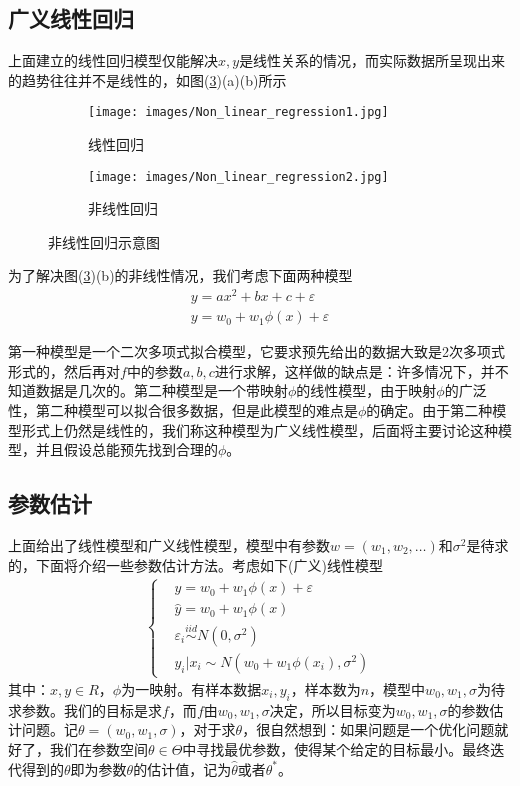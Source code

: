     \subsection{广义线性回归}
        \par
        上面建立的线性回归模型仅能解决$x,y$是线性关系的情况，而实际数据所呈现出来的趋势往往并不是线性的，如图(\ref{fig:非线性回归示意图})(a)(b)所示
\begin{figure}[H]
    \centering
    \begin{subfigure}[b]{0.35\textwidth}
        \texttt{[image: images/Non\_linear\_regression1.jpg]}
        \caption{线性回归}
        \label{fig:线性回归}
    \end{subfigure}
    \begin{subfigure}[b]{0.35\textwidth}
        \texttt{[image: images/Non\_linear\_regression2.jpg]}
        \caption{非线性回归}
        \label{fig:非线性回归}
    \end{subfigure}
    \caption{非线性回归示意图}\label{fig:非线性回归示意图}
\end{figure}
        为了解决图(\ref{fig:非线性回归示意图})(b)的非线性情况，我们考虑下面两种模型
        \begin{align*}
        y = ax^2+bx+c + \varepsilon\\
        y = w_0+w_1\phi(x) +\varepsilon
        \end{align*}
        \par
        第一种模型是一个二次多项式拟合模型，它要求预先给出的数据大致是2次多项式形式的，然后再对$f$中的参数$a,b,c$进行求解，这样做的缺点是：许多情况下，并不知道数据是几次的。第二种模型是一个带映射$\phi$的线性模型，由于映射$\phi$的广泛性，第二种模型可以拟合很多数据，但是此模型的难点是$\phi$的确定。由于第二种模型形式上仍然是线性的，我们称这种模型为广义线性模型，后面将主要讨论这种模型，并且假设总能预先找到合理的$\phi$。
    \subsection{参数估计}
        \par
        上面给出了线性模型和广义线性模型，模型中有参数$w = (w_1,w_2,\dots)$和$\sigma^2$是待求的，下面将介绍一些参数估计方法。考虑如下(广义)线性模型
        \begin{align}
        \label{二维广义线性模型}
        \left\{
        \begin{aligned}
        &y = w_0+w_1\phi(x)+\varepsilon \\
        &\hat{y} = w_0+w_1\phi(x)\\
        &\varepsilon_i\overset{iid}{\sim} N(0,\sigma^2)\\
        &y_i|x_i \sim N(w_0+w_1\phi(x_i),\sigma^2)
        \end{aligned}
        \right.
        \end{align}
        其中：$x,y \in R$，$\phi$为一映射。有样本数据$x_i,y_i$，样本数为$n$，模型中$w_0,w_1,\sigma$为待求参数。我们的目标是求$f$，而$f$由$w_0,w_1,\sigma$决定，所以目标变为$w_0,w_1,\sigma$的参数估计问题。记$\theta = (w_0,w_1,\sigma)$，对于求$\theta$，很自然想到：如果问题是一个优化问题就好了，我们在参数空间$\theta\in \Theta$中寻找最优参数，使得某个给定的目标最小。最终迭代得到的$\theta$即为参数$\theta$的估计值，记为$\hat{\theta}$或者$\theta^*$。
